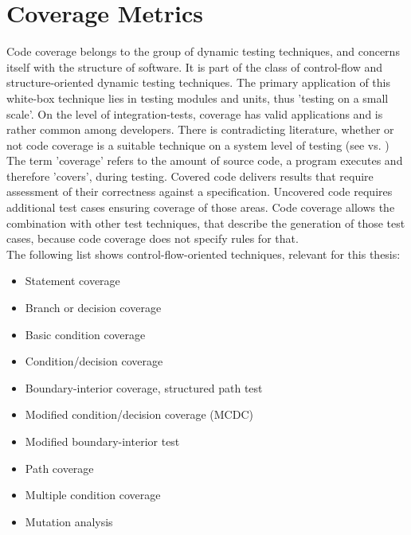 	

\pagebreak	
	\section{Coverage Metrics}
	Code coverage belongs to the group of dynamic testing techniques, and concerns itself with the structure of software. It is part of the class of control-flow and structure-oriented dynamic testing techniques. The primary application of this white-box technique lies in testing modules and units, thus 'testing on a small scale'. On the level of integration-tests, coverage has valid applications and is rather common among developers. There is contradicting literature, whether or not code coverage is a suitable technique on a system level of testing (see \cite{Tian2005} vs. \cite{Liggesmeyer2002} ) \\
	The term 'coverage' refers to the amount of source code, a program executes and therefore 'covers', during testing. Covered code delivers results that require assessment of their correctness against a specification. Uncovered code requires additional test cases ensuring coverage of those areas. Code coverage allows the combination with other test techniques, that describe the generation of those test cases, because code coverage does not specify rules for that. \\
 	
	The following list shows control-flow-oriented techniques, relevant for this thesis:
	\begin{itemize} \setlength\itemsep{1px}
		\item Statement coverage
		\item Branch or decision coverage
		\item Basic condition coverage
		\item Condition/decision coverage
	\item Boundary-interior coverage, structured path test
		\item Modified condition/decision coverage (MCDC)
		\item Modified boundary-interior test
		\item Path coverage
		\item Multiple condition coverage
		\item Mutation analysis \\
	\end{itemize} 

